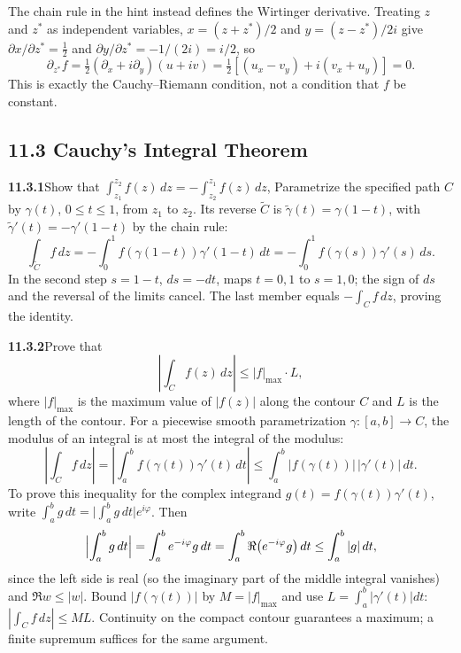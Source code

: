 The chain rule in the hint instead defines the Wirtinger derivative.
Treating $z$ and $z^*$ as independent variables,
$x=(z+z^*)/2$ and $y=(z-z^*)/2i$ give
$\partial x/\partial z^*=\tfrac12$ and
$\partial y/\partial z^*=-1/(2i)=i/2$, so
\[
\partial_{z^*}f
=\tfrac12(\partial_x+i\partial_y)(u+iv)
=\tfrac12[(u_x-v_y)+i(v_x+u_y)]=\boxed0.
\]
This is exactly the Cauchy--Riemann condition, not a condition that
$f$ be constant.

\subsection*{11.3 Cauchy's Integral Theorem}

\par\bigskip
\noindent\textbf{11.3.1}\quad Show that
$\displaystyle\int_{z_{1}}^{z_{2}}f(z)\,dz
=-\int_{z_{2}}^{z_{1}}f(z)\,dz$, 
\solution
Parametrize the specified path $C$ by $\gamma(t)$, $0\le t\le1$,
from $z_1$ to $z_2$. Its reverse $\widetilde C$ is
$\widetilde\gamma(t)=\gamma(1-t)$, with
$\widetilde\gamma'(t)=-\gamma'(1-t)$ by the chain rule:
\[
\int_{\widetilde C}f\,dz
=-\int_0^1f(\gamma(1-t))\gamma'(1-t)\,dt
=-\int_0^1f(\gamma(s))\gamma'(s)\,ds.
\]
In the second step $s=1-t$, $ds=-dt$, maps $t=0,1$ to $s=1,0$; the
sign of $ds$ and the reversal of the limits cancel. The last member
equals $-\int_Cf\,dz$, proving the identity.

\par\bigskip
\noindent\textbf{11.3.2}\quad Prove that
\[
\left|\int_{C}f(z)\,dz\right|\le|f|_{\max}\cdot L,
\]
where  $|f|_{\max}$ is the maximum value of $|f(z)|$ along the contour $C$ and
$L$ is the length of the contour.
\solution
For a piecewise smooth parametrization $\gamma:[a,b]\to C$, the
modulus of an integral is at most the integral of the modulus:
\[
\left|\int_C f\,dz\right|
=\left|\int_a^bf(\gamma(t))\gamma'(t)\,dt\right|
\le\int_a^b|f(\gamma(t))|\,|\gamma'(t)|\,dt.
\]
To prove this inequality for the complex integrand
$g(t)=f(\gamma(t))\gamma'(t)$, write
$\int_a^bg\,dt=\bigl|\int_a^bg\,dt\bigr|e^{i\varphi}$. Then
\[
\Bigl|\int_a^bg\,dt\Bigr|=\int_a^be^{-i\varphi}g\,dt
=\int_a^b\Re\bigl(e^{-i\varphi}g\bigr)\,dt\le\int_a^b|g|\,dt,
\]
since the left side is real (so the imaginary part of the middle
integral vanishes) and $\Re w\le|w|$.
Bound $|f(\gamma(t))|$ by $M=|f|_{\max}$ and use
$L=\int_a^b|\gamma'(t)|dt$:
$\boxed{|\int_Cf\,dz|\le ML}$.
Continuity on the compact contour guarantees a maximum; a finite
supremum suffices for the same argument.

